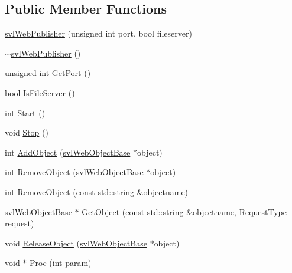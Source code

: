 \subsection*{Public Member Functions}
\begin{DoxyCompactItemize}
\item 
\hyperlink{classsvl_web_publisher_a5e3a0b9676e602ded1e24a2ee7d55f3d}{svl\-Web\-Publisher} (unsigned int port, bool fileserver)
\item 
\hyperlink{classsvl_web_publisher_a3ff9e3e258cef5489d00b62c5b58afde}{$\sim$svl\-Web\-Publisher} ()
\item 
unsigned int \hyperlink{classsvl_web_publisher_a7eb47e2305909509848a8d00a769dfc4}{Get\-Port} ()
\item 
bool \hyperlink{classsvl_web_publisher_a21d7d1cff2a2c5a06172c5f0c20a0b18}{Is\-File\-Server} ()
\item 
int \hyperlink{classsvl_web_publisher_a96c4c669dfde84cb6c53b09c9b017d86}{Start} ()
\item 
void \hyperlink{classsvl_web_publisher_ababd2877a25c15590c3361fec7dedad8}{Stop} ()
\item 
int \hyperlink{classsvl_web_publisher_a34610d8e3c419130f3edc8dc74c28d1a}{Add\-Object} (\hyperlink{classsvl_web_object_base}{svl\-Web\-Object\-Base} $\ast$object)
\item 
int \hyperlink{classsvl_web_publisher_abe521dc2134384e6ce1b01b3816df5ed}{Remove\-Object} (\hyperlink{classsvl_web_object_base}{svl\-Web\-Object\-Base} $\ast$object)
\item 
int \hyperlink{classsvl_web_publisher_aaef372cedb9416b869d64a7b708e9f3a}{Remove\-Object} (const std\-::string \&objectname)
\item 
\hyperlink{classsvl_web_object_base}{svl\-Web\-Object\-Base} $\ast$ \hyperlink{classsvl_web_publisher_a62d6a013066d06aaab56bf4b979d5269}{Get\-Object} (const std\-::string \&objectname, \hyperlink{classsvl_web_publisher_a88f1268e9e8fc3b535e90fc8132643fd}{Request\-Type} request)
\item 
void \hyperlink{classsvl_web_publisher_afabb19c0d42fc41bd03e88ce0a366d4b}{Release\-Object} (\hyperlink{classsvl_web_object_base}{svl\-Web\-Object\-Base} $\ast$object)
\item 
void $\ast$ \hyperlink{classsvl_web_publisher_a1307a7c5aaac23d369be4725808ed63d}{Proc} (int param)
\end{DoxyCompactItemize}



